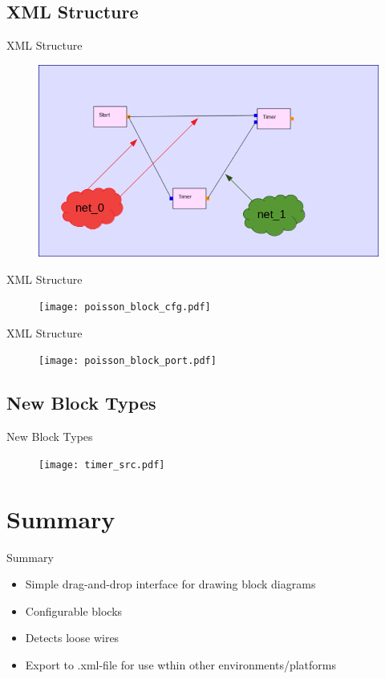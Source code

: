 \documentclass{beamer}
\begin{document}
\subsection*{XML Structure}
\begin{frame}{XML Structure}
    \begin{figure}
        \includegraphics[width=\linewidth]{poisson_nets.png}
        \label{fig:poisson_nets}
    \end{figure}
\end{frame}
\begin{frame}{XML Structure}
    \begin{figure}
        \texttt{[image: poisson\_block\_cfg.pdf]}
        \label{fig:poisson_block_cfg}
    \end{figure}
\end{frame}
\begin{frame}{XML Structure}
    \begin{figure}
        \texttt{[image: poisson\_block\_port.pdf]}
        \label{fig:poisson_block_port}
    \end{figure}
\end{frame}


\subsection*{New Block Types}
\begin{frame}{New Block Types}
    \begin{figure}
        \texttt{[image: timer\_src.pdf]}
        \label{fig:timer_src}
    \end{figure}
\end{frame}

\section{Summary}
\begin{frame}{Summary}
	\begin{itemize}
		\item Simple drag-and-drop interface for drawing block diagrams
        \item Configurable blocks
		\item Detects loose wires
        \item Export to .xml-file for use wthin other environments/platforms
	\end{itemize}
\end{frame}
\end{document}
